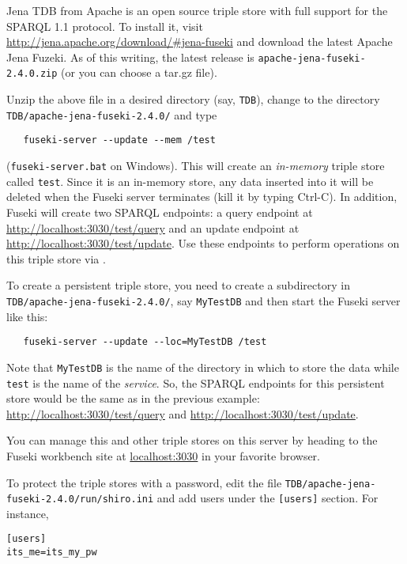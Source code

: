 Jena TDB from Apache is an open source triple store with full support for
the SPARQL 1.1 protocol.
To install it, visit \url{http://jena.apache.org/download/#jena-fuseki}
and download the latest Apache Jena Fuzeki. As of this writing, the latest
release is
\texttt{apache-jena-fuseki-2.4.0.zip} (or you can choose a tar.gz file).

Unzip the above file in a desired directory (say, \texttt{TDB}), change to the directory
\texttt{TDB/apache-jena-fuseki-2.4.0/} and type
\begin{verbatim}
   fuseki-server --update --mem /test
\end{verbatim}
(\texttt{fuseki-server.bat} on Windows).
This will create an \emph{in-memory} triple store called \texttt{test}.
Since it is an in-memory store, any data inserted into it will be deleted
when the Fuseki server terminates (kill it by typing Ctrl-C).
In addition, Fuseki will create two SPARQL endpoints: a query endpoint at
\url{http://localhost:3030/test/query} and an update endpoint at
\url{http://localhost:3030/test/update}. Use these endpoints to perform
operations on this triple store via \ERGO.

To create a persistent triple store, you need to create a subdirectory in
\texttt{TDB/apache-jena-fuseki-2.4.0/}, say \texttt{MyTestDB} and then
start the Fuseki server like this:
\begin{verbatim}
   fuseki-server --update --loc=MyTestDB /test
\end{verbatim}
Note that \texttt{MyTestDB} is the name of the directory in which to store
the data while \texttt{test} is the name of the \emph{service}. So, the
SPARQL endpoints for this persistent store would be the same as in the
previous example:    \url{http://localhost:3030/test/query} and 
\url{http://localhost:3030/test/update}.

You can manage this and other triple stores on this server by heading to
the Fuseki workbench site at \url{localhost:3030} in your favorite browser.

To protect the triple stores with a password, edit the file 
\texttt{TDB/apache-jena-fuseki-2.4.0/run/shiro.ini} and add
users under the \texttt{[users]} section. For instance,
\begin{verbatim}
[users]
its_me=its_my_pw
\end{verbatim}

